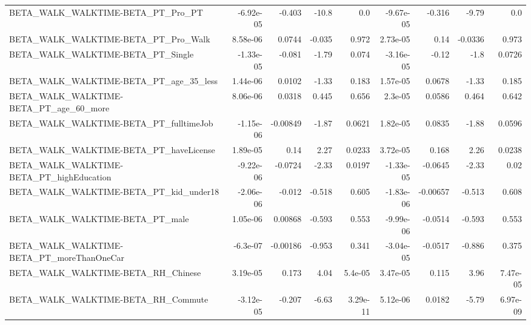 \begin{tabular}{lrrrrrrrr}
BETA\_WALK\_WALKTIME-BETA\_PT\_Pro\_PT                  &   -6.92e-05 &       -0.403 &     -10.8 &      0.0 &  -9.67e-05 &      -0.316 &        -9.79 &           0.0 \\
BETA\_WALK\_WALKTIME-BETA\_PT\_Pro\_Walk                &    8.58e-06 &       0.0744 &    -0.035 &    0.972 &   2.73e-05 &        0.14 &      -0.0336 &         0.973 \\
BETA\_WALK\_WALKTIME-BETA\_PT\_Single                  &   -1.33e-05 &       -0.081 &     -1.79 &    0.074 &  -3.16e-05 &       -0.12 &         -1.8 &        0.0726 \\
BETA\_WALK\_WALKTIME-BETA\_PT\_age\_35\_less             &    1.44e-06 &       0.0102 &     -1.33 &    0.183 &   1.57e-05 &      0.0678 &        -1.33 &         0.185 \\
BETA\_WALK\_WALKTIME-BETA\_PT\_age\_60\_more             &    8.06e-06 &       0.0318 &     0.445 &    0.656 &    2.3e-05 &      0.0586 &        0.464 &         0.642 \\
BETA\_WALK\_WALKTIME-BETA\_PT\_fulltimeJob             &   -1.15e-06 &     -0.00849 &     -1.87 &   0.0621 &   1.82e-05 &      0.0835 &        -1.88 &        0.0596 \\
BETA\_WALK\_WALKTIME-BETA\_PT\_haveLicense             &    1.89e-05 &         0.14 &      2.27 &   0.0233 &   3.72e-05 &       0.168 &         2.26 &        0.0238 \\
BETA\_WALK\_WALKTIME-BETA\_PT\_highEducation           &   -9.22e-06 &      -0.0724 &     -2.33 &   0.0197 &  -1.33e-05 &     -0.0645 &        -2.33 &          0.02 \\
BETA\_WALK\_WALKTIME-BETA\_PT\_kid\_under18             &   -2.06e-06 &       -0.012 &    -0.518 &    0.605 &  -1.83e-06 &    -0.00657 &       -0.513 &         0.608 \\
BETA\_WALK\_WALKTIME-BETA\_PT\_male                    &    1.05e-06 &      0.00868 &    -0.593 &    0.553 &  -9.99e-06 &     -0.0514 &       -0.593 &         0.553 \\
BETA\_WALK\_WALKTIME-BETA\_PT\_moreThanOneCar          &    -6.3e-07 &     -0.00186 &    -0.953 &    0.341 &  -3.04e-05 &     -0.0517 &       -0.886 &         0.375 \\
BETA\_WALK\_WALKTIME-BETA\_RH\_Chinese                 &    3.19e-05 &        0.173 &      4.04 &  5.4e-05 &   3.47e-05 &       0.115 &         3.96 &      7.47e-05 \\
BETA\_WALK\_WALKTIME-BETA\_RH\_Commute                 &   -3.12e-05 &       -0.207 &     -6.63 & 3.29e-11 &   5.12e-06 &      0.0182 &        -5.79 &      6.97e-09 \\

\end{tabular}
